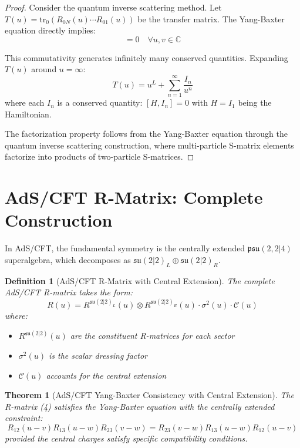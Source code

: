 \documentclass[11pt]{article}
\newtheorem{theorem}{Theorem}
\newtheorem{definition}{Definition}
\begin{document}
\begin{proof}
Consider the quantum inverse scattering method. Let $T(u) = \text{tr}_0(R_{0N}(u) \cdots R_{01}(u))$ be the transfer matrix. The Yang-Baxter equation directly implies:
\begin{equation}
[T(u), T(v)] = 0 \quad \forall u,v \in \mathbb{C}
\end{equation}

This commutativity generates infinitely many conserved quantities. Expanding $T(u)$ around $u = \infty$:
\begin{equation}
T(u) = u^L + \sum_{n=1}^{\infty} \frac{I_n}{u^n}
\end{equation}
where each $I_n$ is a conserved quantity: $[H, I_n] = 0$ with $H = I_1$ being the Hamiltonian.

The factorization property follows from the Yang-Baxter equation through the quantum inverse scattering construction, where multi-particle S-matrix elements factorize into products of two-particle S-matrices.
\end{proof}

\section{AdS/CFT R-Matrix: Complete Construction}

In AdS/CFT, the fundamental symmetry is the centrally extended $\mathfrak{psu}(2,2|4)$ superalgebra, which decomposes as $\mathfrak{su}(2|2)_L \oplus \mathfrak{su}(2|2)_R$.

\begin{definition}[AdS/CFT R-Matrix with Central Extension]
The complete AdS/CFT R-matrix takes the form:
\begin{equation}
R(u) = R^{\mathfrak{su}(2|2)_L}(u) \otimes R^{\mathfrak{su}(2|2)_R}(u) \cdot \sigma^2(u) \cdot \mathcal{C}(u)
\end{equation}
where:
\begin{itemize}
\item $R^{\mathfrak{su}(2|2)}(u)$ are the constituent R-matrices for each sector
\item $\sigma^2(u)$ is the scalar dressing factor
\item $\mathcal{C}(u)$ accounts for the central extension
\end{itemize}
\end{definition}

\begin{theorem}[AdS/CFT Yang-Baxter Consistency with Central Extension]
The R-matrix (4) satisfies the Yang-Baxter equation with the centrally extended constraint:
\begin{equation}
R_{12}(u-v) R_{13}(u-w) R_{23}(v-w) = R_{23}(v-w) R_{13}(u-w) R_{12}(u-v)
\end{equation}
provided the central charges satisfy specific compatibility conditions.
\end{theorem}
\end{document}
